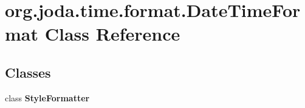 \hypertarget{classorg_1_1joda_1_1time_1_1format_1_1_date_time_format}{\section{org.\-joda.\-time.\-format.\-Date\-Time\-Format Class Reference}
\label{classorg_1_1joda_1_1time_1_1format_1_1_date_time_format}
}
\subsection*{Classes}
\begin{DoxyCompactItemize}
\item 
class {\bfseries Style\-Formatter}
\end{DoxyCompactItemize}
